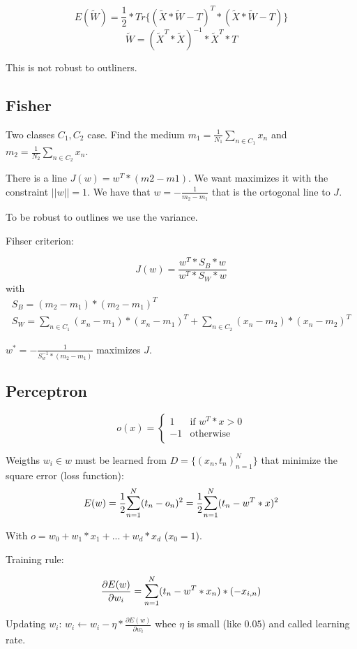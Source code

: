 \[
E(\tilde{W}) = \frac{1}{2}*Tr\Big\{(\tilde{X}*\tilde{W}-T)^T*(\tilde{X}*\tilde{W}-T)\Big\}
\]
\[
\tilde{W} = (\tilde{X}^T*\tilde{X})^{-1}*\tilde{X}^T*T
\]

This is not robust to outliners.

\subsection{Fisher}

Two classes $C_1, C_2$ case. Find the medium $m_1 = \frac{1}{N_1}\sum_{n \in C_1} x_n$ and $m_2 = \frac{1}{N_2}\sum_{n \in C_2} x_n$.

There is a line $J(w) = w^T*(m2-m1)$. We want maximizes it with the constraint $||w||=1$. We have that $w = -\frac{1}{m_2-m_1}$ that is the ortogonal line to $J$.

To be robust to outlines we use the variance.

Fihser criterion: 

\[
J(w) = \frac{w^T*S_B*w}{w^T*S_W*w}
\]
with
\[
\begin{array}{l}
S_B = (m_2-m_1)*(m_2-m_1)^T \\ S_W = \sum_{n \in C_1}(x_n - m_1)*(x_n - m_1)^T + \sum_{n \in C_2}(x_n - m_2)*(x_n - m_2)^T
\end{array}
\]

$w^* = -\frac{1}{S_w^{-1}*(m_2-m_1)}$ maximizes $J$.

\subsection{Perceptron}

\[
o(x) = \begin{cases}
1 & \text{if }w^T*x > 0 \\
-1 & \text{otherwise} \\
\end{cases}
\]

Weigths $w_i \in w$ must be learned from $D = \{(x_n, t_n)_{n=1}^N\}$ that minimize the square error (loss function):
\[
E(w) = \frac{1}{2}\mathlarger{\sum}_{n=1}^N(t_n - o_n)^2 = \frac{1}{2}\mathlarger{\sum}_{n=1}^N(t_n - w^T*x)^2
\]

With $o = w_0 + w_1*x_1 + ... + w_d*x_d$ ($x_0=1$).

Training rule:

\[
\frac{\partial{E(w)}}{\partial{w_i}} = \mathlarger{\sum}_{n=1}^N(t_n - w^T*x_n)*(-x_{i,n})
\]

Updating $w_i$: $w_i \leftarrow w_i - \eta*\frac{\partial{E(w)}}{\partial{w_i}}$ whee $\eta$ is small (like $0.05$) and called learning rate.


